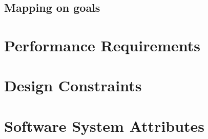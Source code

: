 \subsection{Mapping on goals}
\label{sec: Mapping on goals}


\section{Performance Requirements}
\label{sec:Performance Requirements}%


\section{Design Constraints}
\label{sec:Design Constraints}%


\section{Software System Attributes}
\label{sec:Software System Attributes}%
